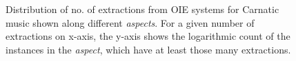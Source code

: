 \documentclass{llncs}
\begin{document}
{\begin{figure}[t]
\begin{center}
{		 \label{fig:quant-carnatic-reltype}
        }%
        \qquad
\end{center}
\caption{Distribution of no. of extractions from OIE systems for Carnatic music shown along different \textit{aspects}. For a given number of extractions on x-axis, the y-axis shows the logarithmic count of the instances in the \textit{aspect}, which have at least those many extractions.}
\label{fig:quant-carnatic}
\end{figure}
}

\end{document}
